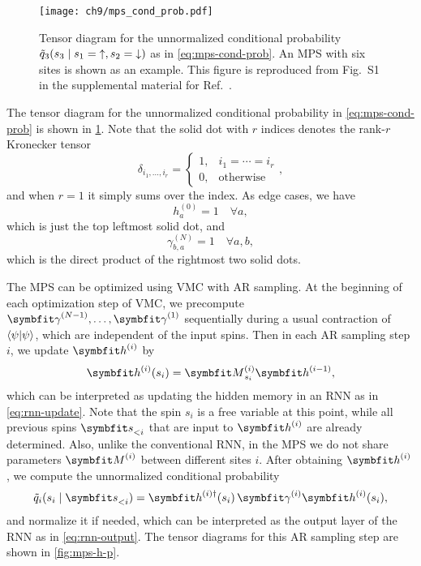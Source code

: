 \begin{figure}[htb]
\centering
\texttt{[image: ch9/mps\_cond\_prob.pdf]}
\caption[Tensor diagram for conditional probability in MPS]{
Tensor diagram for the unnormalized conditional probability $\tilde{q}_3(s_3 \mid s_1 = {\uparrow}, s_2 = {\downarrow})$ as in \cref{eq:mps-cond-prob}. An MPS with six sites is shown as an example.
This figure is reproduced from Fig.~S1 in the supplemental material for Ref.~\cite{wu2023tensor}.
}
\label{fig:mps-cond-prob}
\end{figure}

The tensor diagram for the unnormalized conditional probability in \cref{eq:mps-cond-prob} is shown in \cref{fig:mps-cond-prob}. Note that the solid dot with $r$ indices denotes the rank-$r$ Kronecker tensor
\begin{equation}
\delta_{i_1, \ldots, i_r} = \begin{cases}
1, & i_1 = \cdots = i_r \\
0, & \text{otherwise}
\end{cases},
\end{equation}
and when $r = 1$ it simply sums over the index. As edge cases, we have
\begin{equation}
h^{(0)}_a = 1 \quad \forall a,
\end{equation}
which is just the top leftmost solid dot, and
\begin{equation}
\gamma^{(N)}_{b, a} = 1 \quad \forall a, b,
\end{equation}
which is the direct product of the rightmost two solid dots.

The MPS can be optimized using VMC with AR sampling. At the beginning of each optimization step of VMC, we precompute $\mga^{(N - 1)}, \ldots, \mga^{(1)}$ sequentially during a usual contraction of $\ip{\psi}$, which are independent of the input spins. Then in each AR sampling step $i$, we update $\vh^{(i)}$ by
\begin{equation}
\vh^{(i)}(s_i) = \mM^{(i)}_{s_i} \vh^{(i - 1)},
\label{eq:mps-rnn-h}
\end{equation}
which can be interpreted as updating the hidden memory in an RNN as in \cref{eq:rnn-update}. Note that the spin $s_i$ is a free variable at this point, while all previous spins $\vs_{< i}$ that are input to $\vh^{(i)}$ are already determined. Also, unlike the conventional RNN, in the MPS we do not share parameters $\mM^{(i)}$ between different sites $i$. After obtaining $\vh^{(i)}$, we compute the unnormalized conditional probability
\begin{equation}
\tilde{q}_i(s_i \mid \vs_{< i}) = \vh^{(i) \dagger}(s_i)\,\mga^{(i)} \vh^{(i)}(s_i),
\label{eq:mps-rnn-q}
\end{equation}
and normalize it if needed, which can be interpreted as the output layer of the RNN as in \cref{eq:rnn-output}. The tensor diagrams for this AR sampling step are shown in \cref{fig:mps-h-p}.

